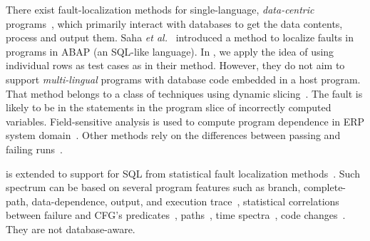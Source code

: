 There exist fault-localization methods for single-language,
{\em data-centric} programs~\cite{dor-issta08,litvak10,saha11}, which
primarily interact with databases to get the data contents, process
and output them. Saha {\em et al.}~\cite{saha11} introduced a method
to localize faults in programs in ABAP (an SQL-like language). In
{\tool}, we apply the idea of using individual rows as test cases as
in their method.
However, they do not aim to support {\em multi-lingual} programs with
database code embedded in a host program. 
%
That method belongs to a class of techniques using dynamic
slicing~\cite{dor-issta08,litvak10,zhang-pldi04,cleve-icsm10}.
The fault is likely to be in the statements in the
program slice of incorrectly computed variables.
Field-sensitive analysis is used to compute program dependence
in ERP system domain~\cite{litvak10}.  Other methods rely on
the differences between passing and failing
runs~\cite{dallmeier-ecoop05,mani-ase10}.

{\tool} is extended to support for SQL from statistical
fault localization
methods~\cite{tarantula05,abreu-ochiai-07,liblit-pldi05}.
Such spectrum can be based on several program features such as branch,
complete-path, data-dependence, output, and execution
trace~\cite{harrold00,santelices09,zhang-fse09,apollo-tse10},
statistical correlations between failure and CFG's
predicates~\cite{liblit-pldi05}, paths~\cite{holmes-icse09},
time spectra~\cite{timespectra08}, code
changes~\cite{stoerzer-fse06}. They are not database-aware.

